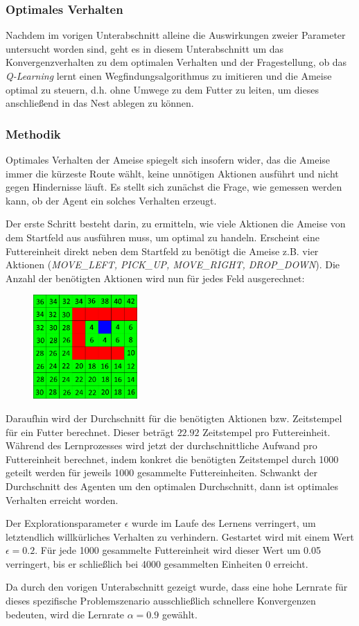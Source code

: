 \subsubsection{Optimales Verhalten}
Nachdem im vorigen Unterabschnitt alleine die Auswirkungen zweier Parameter untersucht worden sind, geht es in diesem Unterabschnitt um das Konvergenzverhalten zu dem optimalen Verhalten und der Fragestellung, ob das \textit{Q-Learning} lernt einen Wegfindungsalgorithmus zu imitieren und die Ameise optimal zu steuern, d.h. ohne Umwege zu dem Futter zu leiten, um dieses anschließend in das Nest ablegen zu können.

\subsubsection*{Methodik}
Optimales Verhalten der Ameise spiegelt sich insofern wider, das die Ameise immer die kürzeste Route wählt, keine unnötigen Aktionen ausführt und nicht gegen Hindernisse läuft. Es stellt sich zunächst die Frage, wie gemessen werden kann, ob der Agent ein solches Verhalten erzeugt. 
\par 
Der erste Schritt besteht darin, zu ermitteln, wie viele Aktionen die Ameise von dem Startfeld aus ausführen muss, um optimal zu handeln. Erscheint eine Futtereinheit direkt neben dem Startfeld zu benötigt die Ameise z.B. vier Aktionen (\textit{MOVE\_LEFT, PICK\_UP, MOVE\_RIGHT, DROP\_DOWN}). Die Anzahl der benötigten Aktionen wird nun für jedes Feld ausgerechnet:
\begin{figure}[H]
    \centering
    \includegraphics[width=150px]{images/NeededTimestampsFromEverywhere}
    \label{fig:test1}
\end{figure}
Daraufhin wird der Durchschnitt für die benötigten Aktionen bzw. Zeitstempel für ein Futter berechnet. Dieser beträgt $22.92$ Zeitstempel pro Futtereinheit. Während des Lernprozesses wird jetzt der durchschnittliche Aufwand pro Futtereinheit berechnet, indem konkret die benötigten Zeitstempel durch 1000 geteilt werden für jeweils 1000 gesammelte Futtereinheiten. Schwankt der Durchschnitt des Agenten um den optimalen Durchschnitt, dann ist optimales Verhalten erreicht worden.
\par 
Der Explorationsparameter $\epsilon$ wurde im Laufe des Lernens verringert, um letztendlich willkürliches Verhalten zu verhindern. Gestartet wird mit einem Wert $\epsilon = 0.2$. Für jede 1000 gesammelte Futtereinheit wird dieser Wert um 0.05 verringert, bis er schließlich bei 4000 gesammelten Einheiten 0 erreicht. 
\par 
Da durch den vorigen Unterabschnitt gezeigt wurde, dass eine hohe Lernrate für dieses spezifische Problemszenario ausschließlich schnellere Konvergenzen bedeuten, wird die Lernrate $\alpha = 0.9$ gewählt.

